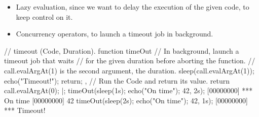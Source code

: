 \begin{itemize}
\item Lazy evaluation, since we want to delay the execution of the
  given code, to keep control on it.
\item Concurrency operators, to launch a timeout job in background.
\end{itemize}

\begin{urbiscript}[firstnumber=1]
// timeout (Code, Duration).
function timeOut
{
  // In background, launch a timeout job that waits
  // for the given duration before aborting the function.
  // call.evalArgAt(1) is the second argument, the duration.
  {
    sleep(call.evalArgAt(1));
    echo("Timeout!");
    return;
  },
  // Run the Code and return its value.
  return call.evalArgAt(0);
} |;
timeOut({sleep(1s); echo("On time"); 42}, 2s);
[00000000] *** On time
[00000000] 42
timeOut({sleep(2s); echo("On time"); 42}, 1s);
[00000000] *** Timeout!
\end{urbiscript}



